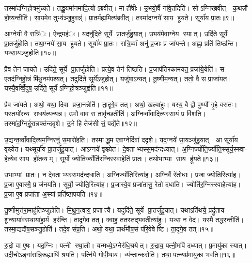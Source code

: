 तस्मा॑दग्निहो॒त्रमु॑च्यते। तद्धू॒यमा॑नमादि॒त्योऽब्रवीत्। मा हौ॑षीः। उ॒भयो॒र्वै ना॑वे॒तदिति॑। सोऽग्निर॑ब्रवीत्। क॒थन्नौ॑ होष्य॒न्तीति॑। सा॒यमे॒व तुभ्य॑ञ्जु॒हुवन्न्॑। प्रा॒तर्मह्य॒मित्य॑ब्रवीत्। तस्मा॑द॒ग्नये॑ सा॒य हू॑यते। सूर्या॑य प्रा॒तः॥९॥

आ॒ग्ने॒यी वै रात्रि॑ः। ऐ॒न्द्रमह॑ः। यदनु॑दिते॒ सूर्ये प्रा॒तर्जु॑हु॒यात्। उ॒भय॑मे॒वाग्ने॒य स्यात्। उदि॑ते॒ सूर्ये प्रा॒तर्जु॑होति। तथा॒ग्नये॑ सा॒य हू॑यते। सूर्या॑य प्रा॒तः। रात्रि॒व्वाँ अनु॑ प्र॒जाः प्र जा॑यन्ते। अह्ना॒ प्रति॑ तिष्ठन्ति। यथ्सा॒यञ्जु॒होति॑॥१०॥

प्रैव तेन॑ जायते। उदि॑ते॒ सूर्ये प्रा॒तर्जु॑होति। प्रत्ये॒व तेन॑ तिष्ठति। प्र॒जाप॑तिरकामयत॒ प्रजा॑ये॒येति॑। स ए॒तद॑ग्निहो॒त्रं मि॑थु॒नम॑पश्यत्। तदुदि॑ते॒ सूर्ये॑ऽजुहोत्। यजु॑षा॒ऽन्यत्। तू॒ष्णीम॒न्यत्। ततो॒ वै स प्राजा॑यत। यस्यै॒वव्विँ॒दुष॒ उदि॑ते॒ सूर्येऽग्निहो॒त्रञ्जुह्व॑ति॥११॥

प्रैव जा॑यते। अथो॒ यथा॒ दिवा प्रजा॒नन्नेति॑। ता॒दृगे॒व तत्। अथो॒ खल्वा॑हुः। यस्य॒ वै द्वौ पुण्यौ॑ गृ॒हे वस॑तः। यस्तयो॑र॒न्य रा॒धय॑त्य॒न्यन्न। उ॒भौ वाव स तावृ॑च्छ॒तीति॑। अ॒ग्निव्वाँवादि॒त्यस्सा॒यं प्र वि॑शति। तस्मा॑द॒ग्निर्दू॒रान्नक्त॑न्ददृशे। उ॒भे हि तेज॑सी सं॒ पद्ये॑ते॥१२॥

उ॒द्यन्त॒व्वाँवादि॒त्यम॒ग्निरनु॑ स॒मारो॑हति। तस्माद्धू॒म ए॒वाग्नेर्दिवा॑ ददृशे। यद॒ग्नये॑ सा॒यञ्जु॑हु॒यात्। आ सूर्या॑य वृश्च्येत। यथ्सूर्या॑य प्रा॒तर्जु॑हु॒यात्। आऽग्नये॑ वृश्च्येत। दे॒वताभ्यस्स॒मद॑न्दध्यात्। अ॒ग्निर्ज्योति॒र्ज्योति॒स्सूर्य॒स्स्वा- हेत्ये॒व सा॒य हो॑त॒व्यम्। सूर्यो॒ ज्योति॒र्ज्योति॑र॒ग्निस्स्वाहेति॑ प्रा॒तः। तथो॒भाभ्या सा॒य हू॑यते॥१३॥

उ॒भाभ्यां प्रा॒तः। न दे॒वताभ्यस्स॒मद॑न्दधाति। अ॒ग्निर्ज्योति॒रित्या॑ह। अ॒ग्निर्वै रे॑तो॒धाः। प्र॒जा ज्योति॒रित्या॑ह। प्र॒जा ए॒वास्मै॒ प्र ज॑नयति। सूर्यो॒ ज्योति॒रित्या॑ह। प्र॒जास्वे॒व प्रजा॑तासु॒ रेतो॑ दधाति। ज्योति॑र॒ग्निस्स्वाहेत्या॑ह। प्र॒जा ए॒व प्रजा॑ता अ॒स्यां प्रति॑ष्ठापयति॥१४॥

तू॒ष्णीमुत्त॑रा॒माहु॑तिञ्जुहोति। मि॒थु॒न॒त्वाय॒ प्रजात्यै। यदुदि॑ते॒ सूर्ये प्रा॒तर्जु॑हु॒यात्। यथाऽति॑थये॒ प्रद्रु॑ताय शू॒न्याया॑वस॒थाया॑हा॒र्य हर॑न्ति। ता॒दृगे॒व तत्। क्वाह॒ तत॒स्तद्भव॒तीत्या॑हुः। यथ्स न वेद॑। यस्मै॒ तद्धर॒न्तीति॑। तस्मा॒द्यदौ॑ष॒सञ्जु॒होति॑। तदे॒व सं॑प्र॒ति। अथो॒ यथा॒ प्रार्थ॑मौष॒सं प॑रि॒वेवेष्टि। ता॒दृगे॒व तत्॥१५॥


रु॒द्रो वा ए॒षः। यद॒ग्निः। पत्नी स्था॒ली। यन्मध्ये॒ऽग्नेर॑धि॒श्रयेत्। रु॒द्राय॒ पत्नी॒मपि॑ दध्यात्। प्र॒मायु॑का स्यात्। उदी॒चोऽङ्गा॑रान्नि॒रूह्याधि॑ श्रयति। पत्नि॑यै गोपी॒थाय॑। व्य॑न्तान्करोति। तथा॒ पत्न्यप्र॑मायुका भवति॥१६॥

